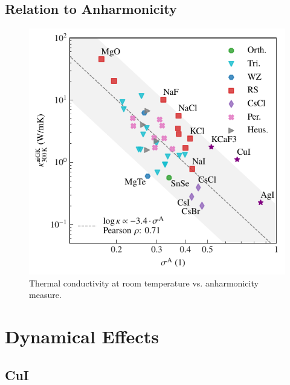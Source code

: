 \documentclass[nobib,a4paper,twoside,notoc,justified,marginals=justified]{tufte-book}
\begin{document}
\subsection{Relation to Anharmonicity}

\begin{figure}
	\includegraphics[width=\textwidth]{./plots/kappa_vs_sigma/kappa_vs_sigma.pdf}
	\caption{Thermal conductivity at room temperature vs. anharmonicity measure.}
	\label{fig:kappa_sigma}
\end{figure}

\section{Dynamical Effects}

\subsection{CuI}
\end{document}
